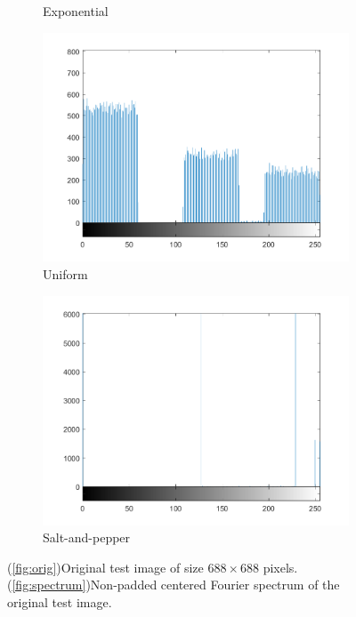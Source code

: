 \begin{figure}[h]
\begin{subfigure}[b]{0.25\linewidth}
		\caption{Exponential}
		\label{fig:add_exp_hist}
	\end{subfigure}
  	\begin{subfigure}[b]{0.25\linewidth}
		\includegraphics[width=\linewidth]{myfigure/p4/41-uniform-hist.png}
		\caption{Uniform}
		\label{fig:add_uniform_hist}
	\end{subfigure}
  	\begin{subfigure}[b]{0.25\linewidth}
		\includegraphics[width=\linewidth]{myfigure/p4/41-saltpepper-hist.png}
		\caption{Salt-and-pepper}
		\label{fig:add_saltpepper_hist}
	\end{subfigure}
  	\caption{(\ref{fig:orig})Original test image of size $688\times 688$ pixels. (\ref{fig:spectrum})Non-padded centered Fourier spectrum of the original test image.}
  	\label{fig:add_noise}
\end{figure}

